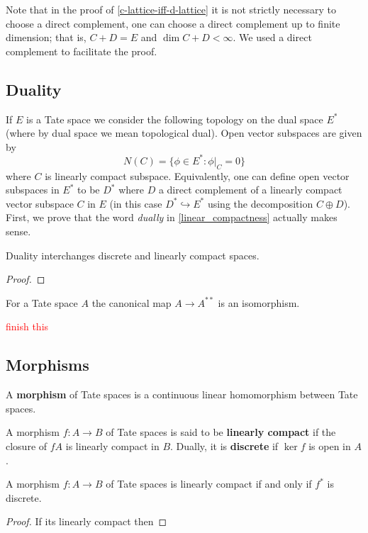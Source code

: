 \begin{remark}\label{up-to-finite-dimension}
	Note that in the proof of \cref{c-lattice-iff-d-lattice} it is not strictly necessary to choose a direct complement, one can choose a direct complement up to finite dimension; that is, $C + D = E$ and $\dim C + D < \infty$. We used a direct complement to facilitate the proof.
\end{remark}
\subsection*{Duality}
If $E$ is a Tate space we consider the following topology on the dual space $E^{*}$ (where by dual space we mean topological dual). Open vector subspaces are given by
\[
	N(C) = \{\phi\in E^{*} \colon \phi\lvert_{C} = 0\}
\]
where $C$ is linearly compact subspace. Equivalently, one can define open vector subspaces in $E^{*}$ to be $D^{*}$ where $D$ a direct complement of a linearly compact vector subspace $C$ in $E$ (in this case $D^{*} \hookrightarrow E^{*}$ using the decomposition $C\oplus D$).  \\
First, we prove that the word \emph{dually} in \cref{linear_compactness} actually makes sense. 
\begin{proposition}\label{duality-d-lattice-c-lattice}
	Duality interchanges discrete and linearly compact spaces.
\end{proposition}
\begin{proof}
	
\end{proof}
\begin{theorem}\label{thm:poincare-duality}
	For a Tate space $A$ the canonical map $A \to A^{**}$ is an isomorphism.
\end{theorem}

\textcolor{red}{finish this}

\subsection*{Morphisms}
A \textbf{morphism} of Tate spaces is a continuous linear homomorphism between Tate spaces.
\begin{definition}\label{def:linearly-compact-and-discrete-morphisms}
	A morphism $f\colon A\to B$ of Tate spaces is said to be \textbf{linearly compact} if the closure of $fA$ is linearly compact in $B$. Dually, it is \textbf{discrete} if $\ker f$ is open in $A$.
\end{definition}
\begin{proposition}\label{prop:duality-discrete-compact-maps}
	A morphism $f\colon A\to B$ of Tate spaces is linearly compact if and only if $f^{*}$ is discrete.
\end{proposition}
\begin{proof}
	If its linearly compact then 
\end{proof}



